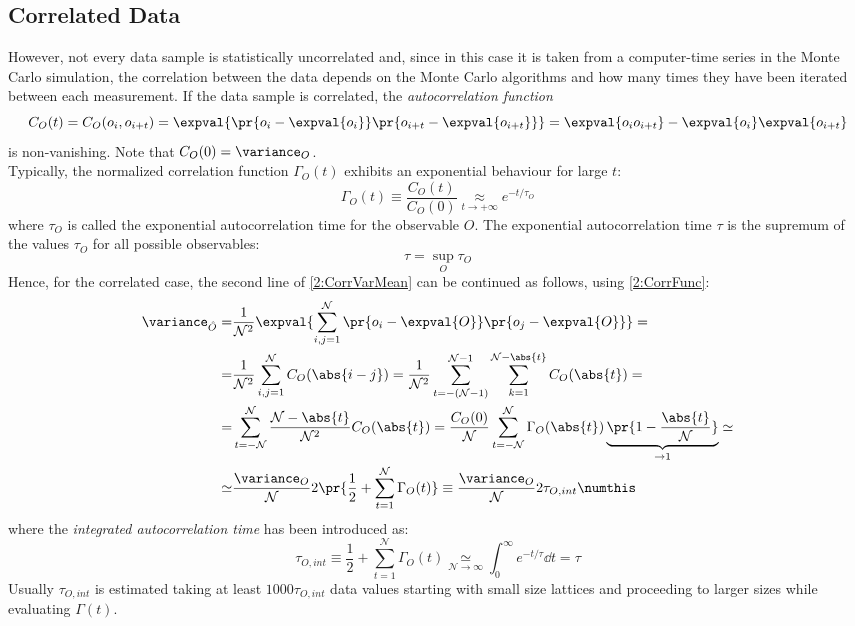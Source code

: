 \subsection{Correlated Data}
However, not every data sample is statistically uncorrelated and, since in this case it is taken from a computer-time series in the Monte Carlo simulation, the correlation between the data depends on the Monte Carlo algorithms and how many times they have been iterated between each measurement.
If the data sample is correlated, the \emph{autocorrelation function}
\begin{equation}
    C_O(t) = C_O(o_i,o_{i+t}) = \expval{\pr{o_i-\expval{o_i}}\pr{o_{i+t}-\expval{o_{i+t}}}} = \expval{o_io_{i+t}}-\expval{o_i}\expval{o_{i+t}} \label{2:CorrFunc}
\end{equation}
is non-vanishing.
Note that $C_O(0)=\variance_O$.\\
Typically, the normalized correlation function $\Gamma_O(t)$ exhibits an exponential behaviour for large $t$:
\begin{equation}
    \Gamma_O(t) \equiv \frac{C_O(t)}{C_O(0)} \underset{t\to+\infty}{\approx} e^{-t/\tau_O} \label{2:NormCorrFun}
\end{equation}
where $\tau_O$ is called the exponential autocorrelation time for the observable $O$.
The exponential autocorrelation time $\tau$ is the supremum of the values $\tau_O$ for all possible observables:
\begin{equation}
    \tau = \sup_O \tau_O \label{2:AutocorrTime}
\end{equation}
Hence, for the correlated case, the second line of \eqref{2:CorrVarMean} can be continued as follows, using \eqref{2:CorrFunc}:
\begin{align*}
    \variance_{\hat{O}} =& \frac1{\mathcal{N}^2}\expval{\sum_{i,j=1}^\mathcal{N}\pr{o_i-\expval{O}}\pr{o_j-\expval{O}}} = \\
    =& \frac1{\mathcal{N}^2} \sum_{i,j=1}^\mathcal{N} C_O(\abs{i-j}) = \frac1{\mathcal{N}^2} \sum_{t=-(\mathcal{N}-1)}^{\mathcal{N}-1}\sum_{k=1}^{\mathcal{N}-\abs{t}}C_O(\abs{t}) = \\
    =& \sum_{t=-\mathcal{N}}^\mathcal{N} \frac{\mathcal{N}-\abs{t}}{\mathcal{N}^2}C_O(\abs{t}) = \frac{C_O(0)}{\mathcal{N}}\sum_{t=-\mathcal{N}}^\mathcal{N} \Gamma_O(\abs{t})\underbrace{\pr{1-\frac{\abs{t}}{\mathcal{N}}}}_{\to1} \simeq \\
    \simeq& \frac{\variance_O}{\mathcal{N}}2\pr{\frac12+\sum_{t=1}^\mathcal{N} \Gamma_O(t)} \equiv \frac{\variance_O}{\mathcal{N}} 2 \tau_{O,int} \numthis\label{2:VarianceCorr}
\end{align*}
where the \emph{integrated autocorrelation time} has been introduced as:
\begin{equation}
    \tau_{O,int} \equiv \frac12+\sum_{t=1}^\mathcal{N}\Gamma_O(t) \underset{\mathcal{N}\to\infty}{\simeq} \int_0^\infty e^{-t/\tau}\dd t = \tau \label{2:IntAutocorrTime}
\end{equation}
Usually $\tau_{O,int}$ is estimated taking at least $1000\tau_{O,int}$ data values starting with small size lattices and proceeding to larger sizes while evaluating $\Gamma(t)$.


